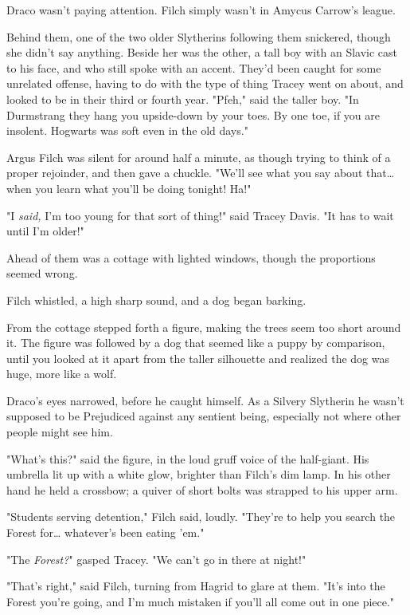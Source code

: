 Draco wasn't paying attention. Filch simply wasn't in Amycus Carrow's league.

Behind them, one of the two older Slytherins following them snickered, though
she didn't say anything. Beside her was the other, a tall boy with an Slavic
cast to his face, and who still spoke with an accent. They'd been caught for
some unrelated offense, having to do with the type of thing Tracey went on
about, and looked to be in their third or fourth year. "Pfeh," said the taller
boy. "In Durmstrang they hang you upside-down by your toes. By one toe, if you
are insolent. Hogwarts was soft even in the old days."

Argus Filch was silent for around half a minute, as though trying to think of a
proper rejoinder, and then gave a chuckle. "We'll see what you say about
that{\ldots} when you learn what you'll be doing tonight! Ha!"

"I \emph{said,} I'm too young for that sort of thing!" said Tracey Davis. "It
has to wait until I'm older!"

Ahead of them was a cottage with lighted windows, though the proportions seemed
wrong.

Filch whistled, a high sharp sound, and a dog began barking.

From the cottage stepped forth a figure, making the trees seem too short around
it. The figure was followed by a dog that seemed like a puppy by comparison,
until you looked at it apart from the taller silhouette and realized the dog
was huge, more like a wolf.

Draco's eyes narrowed, before he caught himself. As a Silvery Slytherin he
wasn't supposed to be Prejudiced against any sentient being, especially not
where other people might see him.

"What's this?" said the figure, in the loud gruff voice of the half-giant. His
umbrella lit up with a white glow, brighter than Filch's dim lamp. In his other
hand he held a crossbow; a quiver of short bolts was strapped to his upper arm.

"Students serving detention," Filch said, loudly. "They're to help you search
the Forest for… whatever's been eating 'em."

"The \emph{Forest?}" gasped Tracey. "We can't go in there at night!"

"That's right," said Filch, turning from Hagrid to glare at them. "It's into
the Forest you're going, and I'm much mistaken if you'll all come out in one
piece."

